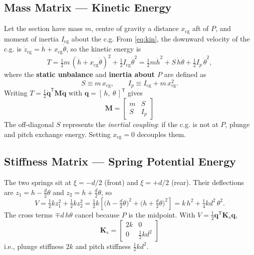 \documentclass[11pt]{article}
\begin{document}
\subsection{Mass Matrix --- Kinetic Energy}
Let the section have mass $m$, centre of gravity a distance $x_{\mathrm{cg}}$ aft
of $P$, and moment of inertia $I_{\mathrm{cg}}$ about the c.g. From \eqref{eq:kin}, the
downward velocity of the c.g. is $\dot z_{\mathrm{cg}}=\dot h + x_{\mathrm{cg}}\dot\theta$,
so the kinetic energy is
\begin{equation}
T = \tfrac12 m\,(\dot h + x_{\mathrm{cg}}\dot\theta)^2 + \tfrac12 I_{\mathrm{cg}}\dot\theta^2
  = \tfrac12 m\dot h^2 + S\,\dot h\dot\theta + \tfrac12 I_p\,\dot\theta^2 ,
\label{eq:T}
\end{equation}
where the \textbf{static unbalance} and \textbf{inertia about $P$} are defined as
\begin{equation}
S \equiv m\,x_{\mathrm{cg}}, \qquad I_p \equiv I_{\mathrm{cg}} + m\,x_{\mathrm{cg}}^2 .
\end{equation}
Writing $T=\tfrac12\dot{\mathbf q}^{\mathsf T}\mathbf M\dot{\mathbf q}$ with
$\mathbf q=[\,h,\ \theta\,]^{\mathsf T}$ gives
\begin{equation}
\boxed{\;\mathbf M=\begin{bmatrix} m & S\\[2pt] S & I_p \end{bmatrix}\;}
\label{eq:M}
\end{equation}
The off-diagonal $S$ represents the \emph{inertial coupling}: if the c.g. is not at $P$, plunge and
pitch exchange energy. Setting $x_{\mathrm{cg}}=0$ decouples them.

\subsection{Stiffness Matrix --- Spring Potential Energy}
The two springs sit at $\xi=-d/2$ (front) and $\xi=+d/2$ (rear). Their deflections are
$z_{1}=h-\tfrac{d}{2}\theta$ and $z_{2}=h+\tfrac{d}{2}\theta$, so
\begin{equation}
V=\tfrac12 k z_1^2+\tfrac12 k z_2^2
 =\tfrac12 k\!\left[\Big(h-\tfrac d2\theta\Big)^2+\Big(h+\tfrac d2\theta\Big)^2\right]
 = k\,h^2+\tfrac14 k d^2\,\theta^2 .
\label{eq:V}
\end{equation}
The cross terms $\mp d\,h\theta$ cancel because $P$ is the midpoint. With
$V=\tfrac12\mathbf q^{\mathsf T}\mathbf K_s\mathbf q$,
\begin{equation}
\boxed{\;\mathbf K_s=\begin{bmatrix} 2k & 0\\[2pt] 0 & \tfrac12 k d^2 \end{bmatrix}\;}
\label{eq:Ks}
\end{equation}
i.e., plunge stiffness $2k$ and pitch stiffness $\tfrac12 kd^2$.
\end{document}
